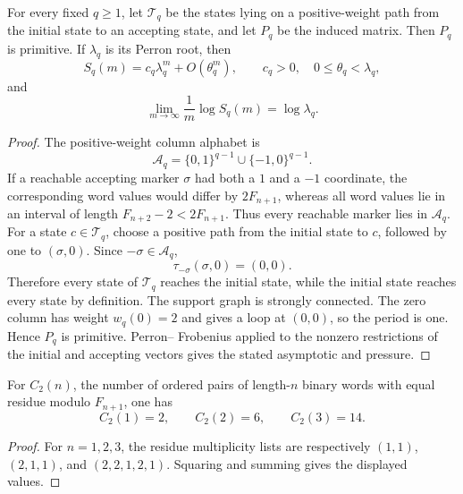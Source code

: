 \begin{theorem}
\label{thm:primitive-intrinsic-moment-transfer}
For every fixed \(q\ge1\), let \(\mathcal T_q\) be the states lying on a
positive-weight path from the initial state to an accepting state, and let
\(P_q\) be the induced matrix.  Then \(P_q\) is primitive.  If \(\lambda_q\)
is its Perron root, then
\[
 S_q(m)=c_q\lambda_q^m+O(\theta_q^m),
 \qquad c_q>0,\quad 0\le\theta_q<\lambda_q,
\]
and
\[
 \lim_{m\to\infty}\frac1m\log S_q(m)=\log\lambda_q .
\]
\end{theorem}
\begin{proof}
The positive-weight column alphabet is
\[
 \mathcal A_q=\{0,1\}^{q-1}\cup\{-1,0\}^{q-1}.
\]
If a reachable accepting marker \(\sigma\) had both a \(1\) and a \(-1\)
coordinate, the corresponding word values would differ by \(2F_{n+1}\),
whereas all word values lie in an interval of length
\(F_{n+2}-2<2F_{n+1}\).  Thus every reachable marker lies in
\(\mathcal A_q\).  For a state \(c\in\mathcal T_q\), choose a positive path
from the initial state to \(c\), followed by one to \((\sigma,0)\).  Since
\(-\sigma\in\mathcal A_q\),
\[
 \tau_{-\sigma}(\sigma,0)=(0,0).
\]
Therefore every state of \(\mathcal T_q\) reaches the initial state, while
the initial state reaches every state by definition.  The support graph is
strongly connected.  The zero column has weight \(w_q(0)=2\) and gives a loop
at \((0,0)\), so the period is one.  Hence \(P_q\) is primitive.  Perron--
Frobenius applied to the nonzero restrictions of the initial and accepting
vectors gives the stated asymptotic and pressure.
\end{proof}

\begin{lemma}
\label{lem:initial-second-moment-enumeration}
For \(C_2(n)\), the number of ordered pairs of length-\(n\) binary words with
equal residue modulo \(F_{n+1}\), one has
\[
 C_2(1)=2,\qquad C_2(2)=6,\qquad C_2(3)=14.
\]
\end{lemma}
\begin{proof}
For \(n=1,2,3\), the residue multiplicity lists are respectively
\((1,1)\), \((2,1,1)\), and \((2,2,1,2,1)\).  Squaring and summing gives the
displayed values.
\end{proof}


